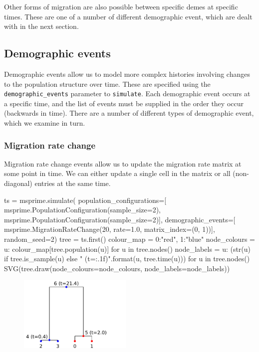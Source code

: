 \documentclass[graybox]{svmult}
\newcommand{\includenbimage}[1]{\begin{center}\texttt{[image: \#1]}\end{center}}
\begin{document}
Other forms of migration are also possible between specific demes at
specific times. These are one of a number of different demographic
event, which are dealt with in the next section.

\subsection{Demographic events}\label{demographic-events}

Demographic events allow us to model more complex histories involving
changes to the population structure over time. These are specified using
the \texttt{demographic\_events} parameter to \texttt{simulate}. Each
demographic event occurs at a specific time, and the list of events must
be supplied in the order they occur (backwards in time). There are a
number of different types of demographic event, which we examine in
turn.

\subsubsection{Migration rate change}\label{migration-rate-change}

Migration rate change events allow us to update the migration rate
matrix at some point in time. We can either update a single cell in the
matrix or all (non-diagonal) entries at the same time.
\begin{pythoncode}
ts  = msprime.simulate(
    population_configurations=[
        msprime.PopulationConfiguration(sample_size=2),
        msprime.PopulationConfiguration(sample_size=2)],
    demographic_events=[
        msprime.MigrationRateChange(20, rate=1.0, matrix_index=(0, 1))],
    random_seed=2)
tree = ts.first()
colour_map = {0:"red", 1:"blue"}
node_colours = {u: colour_map[tree.population(u)] for u in tree.nodes()}
node_labels = {
    u: (str(u) if tree.is_sample(u) else "{} (t={:.1f})".format(u,
tree.time(u)))
    for u in tree.nodes()}
SVG(tree.draw(node_colours=node_colours, node_labels=node_labels))
\end{pythoncode}

\begin{figure}
  \begin{center}
    \includegraphics[width=0.48\textwidth]{images/simulations_34_0}
  \end{center}
\end{figure}
\end{document}
